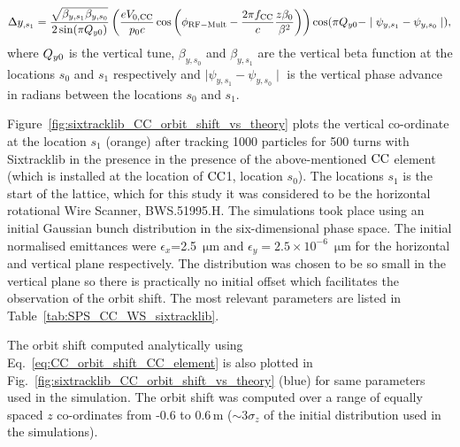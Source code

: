 \begin{equation}\label{eq:CC_orbit_shift_CC_element}
    \Delta y_{,s_1} = \frac{\sqrt{\beta_{y, s_1} \beta_{y, s_0} }}{2 \sin(\pi {Q_{y0}})} \left ( \frac{e V_\mathrm{0,CC}}{p_0 c} \cos{\left ( \phi_\mathrm{RF-Mult} - \frac{2\pi f_\mathrm{CC}}{c} \frac{z \beta_0}{\beta^2} \right )} \right ) \cos(\pi {Q_{y0}} - \mid \psi_{y, s_1} - \psi_{y, s_0} \mid),
\end{equation}
where ${Q_{y0}}$ is the vertical tune, $\beta_{y, s_0}$ and $\beta_{y, s_1}$ are the vertical beta function at the locations $s_0$ and $s_1$ respectively and $\mid \psi_{y, s_1} - \psi_{y, s_0} \mid$ is the vertical phase advance in radians between the locations $s_0$ and $s_1$.


Figure~\ref{fig:sixtracklib_CC_orbit_shift_vs_theory} plots the vertical co-ordinate at the location $s_1$ (orange) after tracking 1000 particles for 500 turns with Sixtracklib in the presence in the presence of the above-mentioned ${\mathrm{CC}}$ element (which is installed at the location of ${\mathrm{CC}}$1, location $s_0$). The locations $s_1$ is the start of the lattice, which for this study it was considered to be the horizontal rotational Wire Scanner, BWS.51995.H. %
The simulations took place using an initial Gaussian bunch distribution in the six-dimensional phase space. The initial normalised emittances were $\epsilon_x$=2.5\, $\mathrm{\mu m}$ and $\epsilon_y=2.5 \times 10^{-6}$\, $\mathrm{\mu m}$ for the horizontal and vertical plane respectively. The distribution was chosen to be so small in the vertical plane so there is practically no initial offset which facilitates the observation of the orbit shift. The most relevant parameters are listed in  Table~\ref{tab:SPS_CC_WS_sixtracklib}. 

The orbit shift computed analytically using Eq.~\eqref{eq:CC_orbit_shift_CC_element} is also plotted in Fig.~\ref{fig:sixtracklib_CC_orbit_shift_vs_theory} (blue) for same parameters used in the simulation. The orbit shift was computed over a range of equally spaced $z$ co-ordinates from -0.6 to 0.6\,m ($\sim 3 \sigma_z$ of the initial distribution used in the simulations). 


